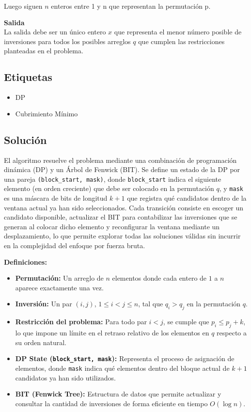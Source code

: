 ﻿\documentclass{article}
\theoremstyle{plain}
\theoremstyle{definition}
\begin{document}
Luego siguen $n$ enteros entre 1 y n que representan la permutación p.


\textbf{Salida}\\

La salida debe ser un único entero $x$ que representa el menor número posible de inversiones para todos los posibles arreglos $q$ que cumplen las restricciones planteadas en el problema.


\subsection{Etiquetas}

\begin{itemize}
    \item DP
    \item Cubrimiento Mínimo
\end{itemize}

\subsection{Solución}
El algoritmo resuelve el problema mediante una combinación de programación dinámica (DP) y un Árbol de Fenwick (BIT). Se define un estado de la DP por una pareja \texttt{(block\_start, mask)}, donde \texttt{block\_start} indica el siguiente elemento (en orden creciente) que debe ser colocado en la permutación $q$, y \texttt{mask} es una máscara de bits de longitud $k+1$ que registra qué candidatos dentro de la ventana actual ya han sido seleccionados. Cada transición consiste en escoger un candidato disponible, actualizar el BIT para contabilizar las inversiones que se generan al colocar dicho elemento y reconfigurar la ventana mediante un desplazamiento, lo que permite explorar todas las soluciones válidas sin incurrir en la complejidad del enfoque por fuerza bruta.

\textbf{Definiciones:}
\begin{itemize}
    \item \textbf{Permutación:} Un arreglo de $n$ elementos donde cada entero de $1$ a $n$ aparece exactamente una vez.
    \item \textbf{Inversión:} Un par $(i,j)$, $1 \le i < j \le n$, tal que $q_i > q_j$ en la permutación $q$.
    \item \textbf{Restricción del problema:} Para todo par $i<j$, se cumple que $p_i \le p_j + k$, lo que impone un límite en el retraso relativo de los elementos en $q$ respecto a su orden natural.
    \item \textbf{DP State (\texttt{block\_start, mask}):} Representa el proceso de asignación de elementos, donde \texttt{mask} indica qué elementos dentro del bloque actual de $k+1$ candidatos ya han sido utilizados.
    \item \textbf{BIT (Fenwick Tree):} Estructura de datos que permite actualizar y consultar la cantidad de inversiones de forma eficiente en tiempo $O(\log n)$.
\end{itemize}
\end{document}
